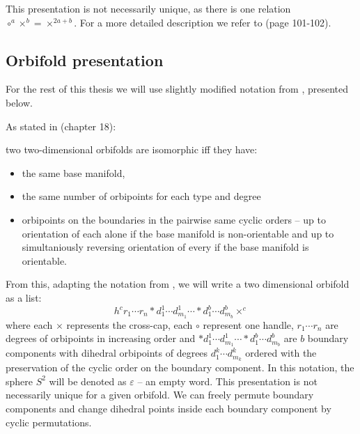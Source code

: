 This presentation is not necessarily unique, as 
there is one relation $\circ^a\times^b = \times^{2a+b}$. For a more 
detailed description we refer to \cite{Conway2016} (page 101-102).

\subsection{Orbifold presentation}
For the rest of this thesis we will use slightly modified notation from \cite{Conway2016}, 
presented below.

As stated in \cite{Conway2016} (chapter 18): 
\begin{theorem}
two two-dimensional orbifolds are 
isomorphic iff they have:
\begin{itemize}\label{sameness}
\item the same base manifold, 
\item the same number of orbipoints for each type and degree 
\item orbipoints on the boundaries 
in the pairwise same cyclic orders -- up to orientation of each alone
if the base manifold is non-orientable  
and up to simultaniously reversing orientation of every if the base manifold is orientable.
\end{itemize}
\end{theorem}
From this, adapting the notation from \cite{Conway2016}, we will write 
a two dimensional 
orbifold as a list: 
\begin{equation}
h^cr_1\cdots r_n 
*d_1^1\cdots d_{m_1}^1 \cdots *d_1^b\cdots d_{m_b}^b\times^c
\end{equation}
where each $\times$ represents the cross-cap, 
each $\circ$ represent one handle, 
$r_1\cdots r_n$ are degrees of orbipoints in increasing order and 
$*d_1^1\cdots d_{m_1}^1 \cdots *d_1^b\cdots d_{m_b}^b$ are $b$ boundary components 
with dihedral orbipoints of degrees $d_1^k\cdots d_{m_k}^k$ ordered with the preservation 
of the cyclic order on the boundary component. 
In this notation, the sphere $S^2$ will be denoted as $\varepsilon$ -- an empty word.
This presentation is not necessarily unique for a given orbifold. We can freely permute 
boundary components and change dihedral points inside each boundary component by cyclic 
permutations. 
